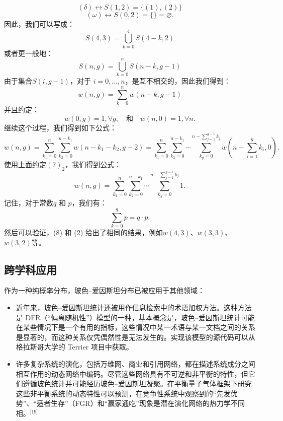 \[
(\delta) \longleftrightarrow S(1, 2) = \{ (1), (2) \}~
\]
\[
(\omega) \longleftrightarrow S(0, 2) = \{\} = \varnothing.~
\]
因此，我们可以写成：
\[
S(4, 3) = \bigcup_{k = 0}^{4} S(4 - k, 2)~
\]
或者更一般地：
\[
S(n, g) = \bigcup_{k = 0}^{n} S(n - k, g - 1)~
\]
由于集合\( S(i, g - 1) \)，对于 \( i = 0, \dots, n \)，是互不相交的，因此我们得到：
\[
w(n, g) = \sum_{k = 0}^{n} w(n - k, g - 1)~
\]
并且约定：
\[
w(0, g) = 1, \forall g, \quad \text{和} \quad w(n, 0) = 1, \forall n.~
\]
继续这个过程，我们得到如下公式：
\[
w(n, g) = \sum_{k_1 = 0}^{n} \sum_{k_2 = 0}^{n - k_1} w(n - k_1 - k_2, g - 2) = \sum_{k_1 = 0}^{n} \sum_{k_2 = 0}^{n - k_1} \cdots \sum_{k_g = 0}^{n - \sum_{j = 1}^{g - 1} k_j} w(n - \sum_{i = 1}^{g} k_i, 0).~
\]
使用上面约定\((7)_2\)，我们得到公式：
\[
w(n, g) = \sum_{k_1 = 0}^{n} \sum_{k_2 = 0}^{n - k_1} \cdots \sum_{k_g = 0}^{n - \sum_{j = 1}^{g - 1} k_j} 1.~
\]
记住，对于常数\( q \) 和 \( p \)，我们有：
\[
\sum_{k = 0}^{q} p = q \cdot p.~
\]
然后可以验证，(8) 和 (2) 给出了相同的结果，例如\( w(4, 3) \)、\( w(3, 3) \)、\( w(3, 2) \)等。
\subsection{跨学科应用}
作为一种纯概率分布，玻色–爱因斯坦分布已被应用于其他领域：
\begin{itemize}
\item 近年来，玻色–爱因斯坦统计还被用作信息检索中的术语加权方法。这种方法是 DFR（“偏离随机性”）模型的一种，基本概念是，玻色–爱因斯坦统计可能在某些情况下是一个有用的指标，这些情况中某一术语与某一文档之间的关系是显著的，而这种关系仅凭偶然性是无法发生的。实现该模型的源代码可以从格拉斯哥大学的 Terrier 项目中获取。
\item 许多复杂系统的演化，包括万维网、商业和引用网络，都在描述系统成分之间相互作用的动态网络中编码。尽管这些网络具有不可逆和非平衡的特性，但它们遵循玻色统计并可能经历玻色–爱因斯坦凝聚。在平衡量子气体框架下研究这些非平衡系统的动态特性可以预测，在竞争性系统中观察到的“先发优势”、“适者生存”（FGR）和“赢家通吃”现象是潜在演化网络的热力学不同相。\(^\text{[19]}\)
\end{itemize}